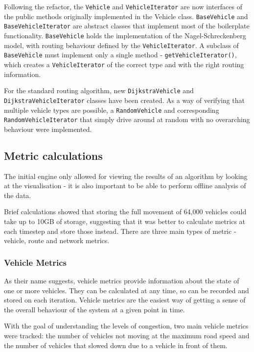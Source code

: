 \documentclass[ %
                    author={Alexander Hill},
                supervisor={Dr. Benjamin Sach},
                    degree={MEng},
                     title={MARMOSET},
                  subtitle={Multi-Agent Route Management using Online Simulation for Efficient Transportation},
                      type={research},
                      year={2016} ]{dissertation}
\begin{document}
Following the refactor, the \texttt{Vehicle} and \texttt{VehicleIterator} are
now interfaces of the public methods originally implemented in the Vehicle
class.  \texttt{BaseVehicle} and \texttt{BaseVehicleIterator} are abstract
classes that implement most of the boilerplate functionality.
\texttt{BaseVehicle} holds the implementation of the Nagel-Schreckenberg model,
with routing behaviour defined by the \texttt{VehicleIterator}. A subclass of
\texttt{BaseVehicle} must implement only a single method -
\texttt{getVehicleIterator()}, which creates a \texttt{VehicleIterator} of the
correct type and with the right routing information.

For the standard routing algorithm, new \texttt{DijkstraVehicle} and
\texttt{DijkstraVehicleIterator} classes have been created. As a way of
verifying that multiple vehicle types are possible, a \texttt{RandomVehicle} and
corresponding \texttt{RandomVehicleIterator} that simply drive around at random
with no overarching behaviour were implemented.

\subsection{Metric calculations}

The initial engine only allowed for viewing the results of an algorithm by
looking at the visualisation - it is also important to be able to perform
offline analysis of the data.

Brief calculations showed that storing the full movement of 64,000 vehicles
could take up to 10GB of storage, suggesting that it was better to calculate
metrics at each timestep and store those instead. There are three main types of
metric - vehicle, route and network metrics.

\subsubsection{Vehicle Metrics}

As their name suggests, vehicle metrics provide information about the state of
one or more vehicles. They can be calculated at any time, so can be recorded and
stored on each iteration. Vehicle metrics are the easiest way of getting a sense
of the overall behaviour of the system at a given point in time.

With the goal of understanding the levels of congestion, two main vehicle
metrics were tracked: the number of vehicles not moving at the maximum road
speed and the number of vehicles that slowed down due to a vehicle in front of
them.
\end{document}
